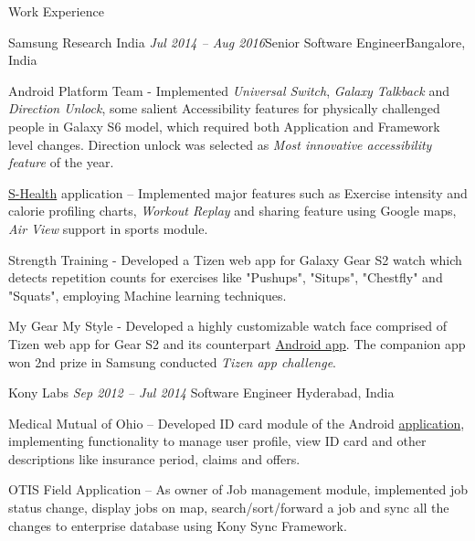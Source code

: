 \documentclass{resume} %
\begin{document}

\begin{rSection}{Work Experience}


\begin{rSubsection}{Samsung Research India}{\emph{ Jul 2014 -- Aug 2016}}{Senior Software Engineer}{Bangalore, India}
\item Android Platform Team - Implemented {\emph{Universal Switch}}, {\emph{Galaxy Talkback}} and {\emph{Direction Unlock}}, some salient Accessibility features for physically challenged people in Galaxy S6 model, which required both Application and Framework level changes. Direction unlock was selected as {\emph{Most innovative accessibility feature}} of the year.
\item \href{https://play.google.com/store/apps/details?id=com.sec.android.app.shealth&hl=en}{S-Health} application -- Implemented major features such as Exercise intensity and calorie profiling charts, {\emph{Workout Replay}} and sharing feature using Google maps, {\emph{Air View}} support in sports module.
\item Strength Training - Developed a Tizen web app for Galaxy Gear S2 watch which detects repetition counts for exercises like "Pushups", "Situps", "Chestfly" and "Squats", employing Machine learning techniques.
\item My Gear My Style - Developed a highly customizable watch face comprised of Tizen web app for Gear S2 and its counterpart \href{https://play.google.com/store/apps/details?id=com.samsung.mygearmystyle&hl=en}{Android app}. The companion app won 2nd prize in Samsung conducted {\emph{Tizen app challenge}}.
\end{rSubsection}


\begin{rSubsection}{Kony Labs} {\emph{Sep 2012 -- Jul 2014}} {Software Engineer}
{Hyderabad, India}
\item Medical Mutual of Ohio -- Developed ID card module of the Android \href{https://play.google.com/store/apps/details?id=com.medmutual.mhp&hl=en} {application}, implementing functionality to manage user profile, view ID card and other descriptions like insurance period, claims and offers.
\item OTIS Field Application -- As owner of Job management module, implemented job status change, display jobs on map, search/sort/forward a job and sync all the changes to enterprise database using Kony Sync Framework.


\end{rSubsection}
\end{rSection}
\end{document}
